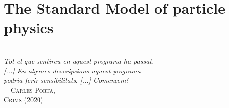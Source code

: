 \begin{comment}
%

\end{comment}


\chapter{The Standard Model of particle physics}
\label{chap:Introduction}



\vspace*{0.1 cm} 
\hspace*{200pt} \\
\hspace*{120pt} \textit{Tot el que sentireu en aquest programa ha passat.} \\
\hspace*{120pt} \textit{[...] En algunes descripcions aquest programa} \\
\hspace*{120pt} \textit{podria ferir sensibilitats. [...] Començem!} \\
\hspace*{205pt} ---\textsc{Carles Porta,} \\%
\hspace*{240 pt}     \textsc{Crims (2020)} \\%
\vspace*{2cm} 


